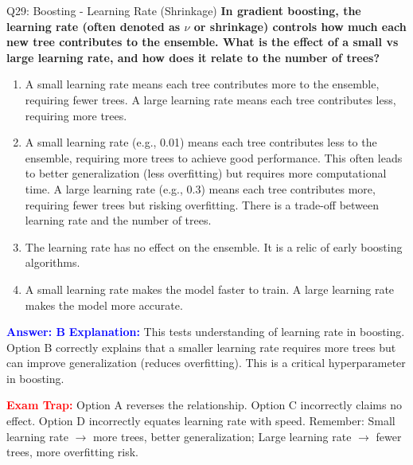 \documentclass[8pt]{beamer}
\begin{document}
	\begin{frame}{Q29: Boosting - Learning Rate (Shrinkage)}
		\fontsize{6.5}{7.5}\selectfont
		\textbf{In gradient boosting, the learning rate (often denoted as $\nu$ or shrinkage) controls how much each new tree contributes to the ensemble. What is the effect of a small vs large learning rate, and how does it relate to the number of trees?}
		
		\begin{enumerate}
			\item A small learning rate means each tree contributes more to the ensemble, requiring fewer trees. A large learning rate means each tree contributes less, requiring more trees.
			\item A small learning rate (e.g., 0.01) means each tree contributes less to the ensemble, requiring more trees to achieve good performance. This often leads to better generalization (less overfitting) but requires more computational time. A large learning rate (e.g., 0.3) means each tree contributes more, requiring fewer trees but risking overfitting. There is a trade-off between learning rate and the number of trees.
			\item The learning rate has no effect on the ensemble. It is a relic of early boosting algorithms.
			\item A small learning rate makes the model faster to train. A large learning rate makes the model more accurate.
		\end{enumerate}
		
		\vspace{0.1cm}
		\textcolor{blue}{\textbf{Answer: B}}
		\vspace{0.1cm}
		\textcolor{blue}{\textbf{Explanation:}} This tests understanding of learning rate in boosting. Option B correctly explains that a smaller learning rate requires more trees but can improve generalization (reduces overfitting). This is a critical hyperparameter in boosting.
		
		\textcolor{red}{\textbf{Exam Trap:}} Option A reverses the relationship. Option C incorrectly claims no effect. Option D incorrectly equates learning rate with speed. Remember: Small learning rate $\rightarrow$ more trees, better generalization; Large learning rate $\rightarrow$ fewer trees, more overfitting risk.
	\end{frame}
	
\end{document}
